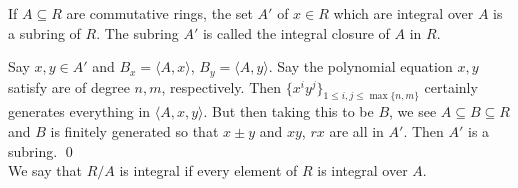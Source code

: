 \begin{cor}
If $A \subseteq R$ are commutative rings, the set $A'$ of $x \in R$ which are integral over $A$ is a subring of $R$. The subring $A'$ is called the integral closure of $A$ in $R$.
\end{cor}

\pf Say $x,y \in A'$ and $B_x=\langle A,x \rangle$, $B_y=\langle A,y \rangle$. Say the polynomial equation $x,y$ satisfy are of degree $n,m$, respectively. Then $\{x^i y^j\}_{1\leq i,j \leq \max\{n,m\}}$ certainly generates everything in $\langle A,x,y \rangle$. But then taking this to be $B$, we see $A \subseteq B \subseteq R$ and $B$ is finitely generated so that $x \pm y$ and $xy$, $rx$ are all in $A'$. Then $A'$ is a subring. \qed \\

\tb We say that $R/A$ is integral if every element of $R$ is integral over $A$. 